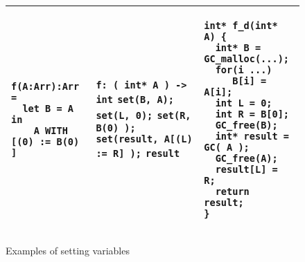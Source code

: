 \documentclass[12pt,a4paper]{article}
\newcommand{\cl}[1]{\texttt{#1}}
\begin{document}
\begin{figure}[!ht]
\begin{tabular}{|p{5.2cm}|p{5.8cm}|p{6cm}|}
\begin{lstlisting}
f(A:Arr):Arr =
  let B = A in
    A WITH [(0) := B(0) ]
\end{lstlisting} &
\cl{f: ( int* A ) -> int} \newline
\cl{set(B, A);} \newline
\cl{set(L, 0);} \newline
\cl{set(R, B(0) );} \newline
\cl{set(result, A[(L) := R] );} \newline
\cl{result} &
\begin{lstlisting}
int* f_d(int* A) {
  int* B = GC_malloc(...);
  for(i ...)
     B[i] = A[i];
  int L = 0;
  int R = B[0];
  GC_free(B);
  int* result = GC( A );
  GC_free(A);
  result[L] = R;
  return result;
}
\end{lstlisting} \\ \hline
\end{tabular}
\caption{Examples of setting variables}
\end{figure}
\end{document}
